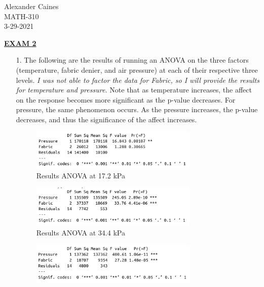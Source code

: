 \documentclass[12pt]{article}
\begin{document}
\vspace{1.0 \baselineskip}

\begin{flushright}
	Alexander Caines\\
	MATH-310\\
	3-29-2021\\
\end{flushright}

\begin{center}
	\textbf{\underline{EXAM 2}}
\end{center}



\begin{enumerate}
	\item[1.] The following are the results of running an ANOVA on the three factors (temperature, fabric denier, and air pressure) 
	at each of their respective three levels. \emph{I was not able to factor the data for Fabric, so I will provide the results for 
		temperature and pressure.} Note that as temperature increases, the affect on the response becomes
		 more significant as the p-value decreases. For pressure, the same phenomenon occurs. As the pressure increases, the p-value 
		decreases, and thus the significance of the affect increases. 
			\begin{figure}[!h]
				\centering
				\includegraphics[width=8cm]{p1pics/8degrees.png}
				\caption{Results ANOVA at 17.2 kPa}
			\end{figure}
			\begin{figure}[!h]
				\centering
				\includegraphics[width=8cm]{p1pics/50degrees.png}
				\caption{Results ANOVA at 34.4 kPa}
			\end{figure}
			\begin{figure}[!h]
				\centering
				\includegraphics[width=8cm]{p1pics/75degrees.png}

\end{figure}
\end{enumerate}
\end{document}
